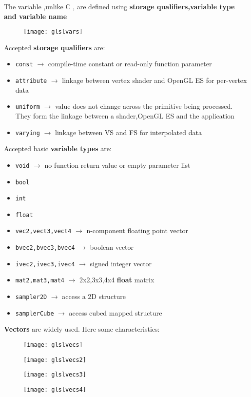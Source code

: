 The variable ,unlike C , are defined using \textbf{storage qualifiers,variable type and variable name}
 \begin{figure}[H]
 \centering
 \texttt{[image: glslvars]} 
 \end{figure} 
Accepted \textbf{storage qualifiers} are: 
\begin{itemize}
\item \texttt{const} $\to$ compile-time constant or read-only function parameter
\item  \texttt{attribute} $\to$ linkage between vertex shader and OpenGL ES for per-vertex data
\item  \texttt{uniform} $\to$ value does not change across the primitive being processed. They form the linkage between a shader,OpenGL ES and the application
\item  \texttt{varying} $\to$ linkage between VS and FS for interpolated data
\end{itemize}
Accepted basic \textbf{variable types} are:
\begin{itemize}
\item  \texttt{void} $\to$ no function return value or empty parameter list
\item  \texttt{bool}
\item  \texttt{int}
\item  \texttt{float}
\item  \texttt{vec2,vect3,vect4} $\to$ n-component floating point vector
\item  \texttt{bvec2,bvec3,bvec4} $\to$ boolean vector
\item  \texttt{ivec2,ivec3,ivec4} $\to$ signed integer vector
\item  \texttt{mat2,mat3,mat4} $\to$ 2x2,3x3,4x4 \textbf{float} matrix
\item  \texttt{sampler2D} $\to$ access a 2D structure
\item  \texttt{samplerCube} $\to$ access cubed mapped structure
\end{itemize}
\textbf{Vectors} are widely used. Here some characteristics:
\begin{figure}[H]
 \centering
 \texttt{[image: glslvecs]} 
\end{figure} 
\begin{figure}[H]
 \centering
 \texttt{[image: glslvecs2]} 
\end{figure} 
\begin{figure}[H]
 \centering
 \texttt{[image: glslvecs3]} 
\end{figure} 
\begin{figure}[H]
 \centering
 \texttt{[image: glslvecs4]} 
\end{figure} 

